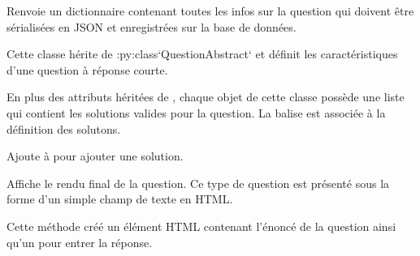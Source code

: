 \documentclass[a4,10pt,french]{sphinxmanual}
\begin{document}
\begin{fulllineitems}
\begin{fulllineitems}
\end{fulllineitems}


\begin{fulllineitems}
\label{front-end:QuestionAbstract.properties}
Renvoie un dictionnaire contenant toutes les infos sur la question qui doivent
être sérialisées en JSON et enregistrées sur la base de données.

\end{fulllineitems}


\end{fulllineitems}


\begin{fulllineitems}
\label{front-end:SimpleQuestion}
Cette classe hérite de :py:class{}`QuestionAbstract{}` et définit les caractéristiques
d'une question à réponse courte.

En plus des attributs héritées de , chaque objet
de cette classe possède une liste  qui contient les solutions valides
pour la question. La balise \code{=} est associée à la définition des solutons.

\begin{fulllineitems}
\label{front-end:SimpleQuestion.add_answer}
Ajoute  à  pour ajouter une solution.

\end{fulllineitems}


\begin{fulllineitems}
\label{front-end:SimpleQuestion.render}
Affiche le rendu final de la question. Ce type de question est présenté sous
la forme d'un simple champ de texte en HTML.

Cette méthode créé un élément HTML  contenant l'énoncé de la question
ainsi qu'un  pour entrer la réponse.

\end{fulllineitems}


\end{fulllineitems}
\end{document}
